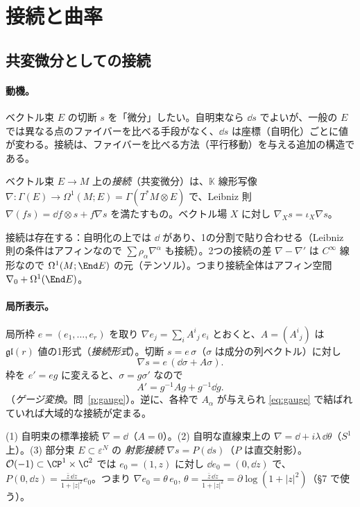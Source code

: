 
\section{接続と曲率}
\subsection{共変微分としての接続}
\paragraph{動機。}ベクトル束 $E$ の切断 $s$ を「微分」したい。自明束なら $\dd s$ でよいが、一般の $E$ では異なる点のファイバーを比べる手段がなく、$\dd s$ は座標（自明化）ごとに値が変わる。接続は、ファイバーを比べる方法（平行移動）を与える追加の構造である。

\begin{defn}[接続]
ベクトル束 $E\to M$ 上の\emph{接続}（共変微分）は、$\mathbb K$ 線形写像 $\nabla:\Gamma(E)\to\Omega^1(M;E)=\Gamma(T^*M\otimes E)$ で、Leibniz 則 $\nabla(fs)=\dd f\otimes s+f\nabla s$ を満たすもの。ベクトル場 $X$ に対し $\nabla_Xs=\iota_X\nabla s$。
\end{defn}

接続は存在する：自明化の上では $\dd$ があり、1の分割で貼り合わせる（Leibniz 則の条件はアフィンなので $\sum\rho_\alpha\nabla^\alpha$ も接続）。2つの接続の差 $\nabla-\nabla'$ は $C^\infty$ 線形なので $\Omega^1(M;\End E)$ の元（テンソル）。つまり接続全体はアフィン空間 $\nabla_0+\Omega^1(\End E)$。

\paragraph{局所表示。}局所枠 $e=(e_1,\dots,e_r)$ を取り $\nabla e_j=\sum_iA^i{}_j\,e_i$ とおくと、$A=(A^i{}_j)$ は $\mathfrak{gl}(r)$ 値の1形式（\emph{接続形式}）。切断 $s=e\,\sigma$（$\sigma$ は成分の列ベクトル）に対し
\[
\nabla s=e\,(\dd\sigma+A\sigma).
\]
枠を $e'=eg$ に変えると、$\sigma=g\sigma'$ なので
\begin{equation}\label{eq:gauge}
A'=g^{-1}Ag+g^{-1}\dd g.
\end{equation}
（\emph{ゲージ変換}。問~\ref{p:gauge}）。逆に、各枠で $A_\alpha$ が与えられ \eqref{eq:gauge} で結ばれていれば大域的な接続が定まる。

\begin{ex}
(1) 自明束の標準接続 $\nabla=\dd$（$A=0$）。(2) 自明な直線束上の $\nabla=\dd+i\lambda\,\dd\theta$（$S^1$ 上）。(3) 部分束 $E\subset\varepsilon^N$ の \emph{射影接続} $\nabla s=P(\dd s)$（$P$ は直交射影）。$\mathcal O(-1)\subset\CP^1\times\C^2$ では $e_0=(1,z)$ に対し $\dd e_0=(0,\dd z)$ で、$P(0,\dd z)=\frac{\bar z\,\dd z}{1+|z|^2}e_0$。つまり $\nabla e_0=\theta\,e_0$, $\theta=\frac{\bar z\,\dd z}{1+|z|^2}=\partial\log(1+|z|^2)$（§7 で使う）。
\end{ex}

